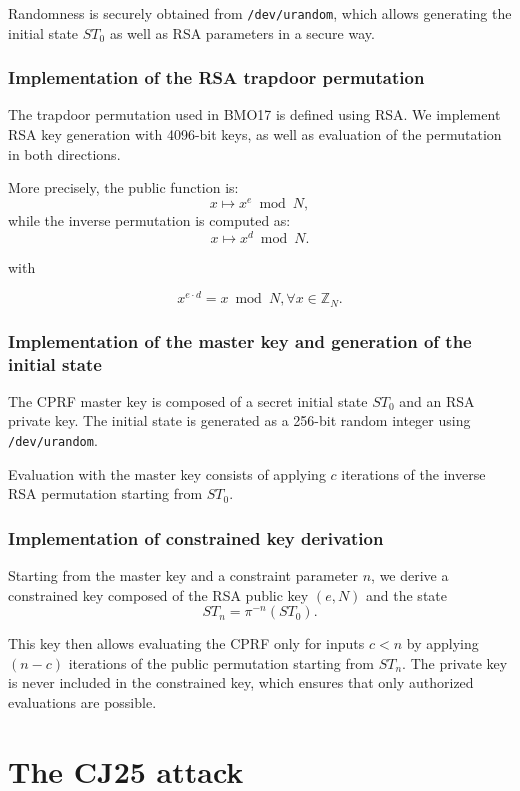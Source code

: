 \documentclass[9pt]{extarticle}
\begin{document}
Randomness is securely obtained from \texttt{/dev/urandom}, which
allows generating the initial state $ST_0$ as well as RSA parameters in a secure way.

\subsubsection{Implementation of the RSA trapdoor permutation}

The trapdoor permutation used in BMO17 is defined using RSA.
We implement RSA key generation with 4096-bit keys, as well as evaluation
of the permutation in both directions.

More precisely, the public function is:
\[
x \mapsto x^e \bmod N,
\]
while the inverse permutation is computed as:
\[
x \mapsto x^d \bmod N.
\]

with

\[
x^{e \cdot d} = x \bmod N , \forall x \in \mathbb{Z}_N.
\]

\subsubsection{Implementation of the master key and generation of the initial state}

The CPRF master key is composed of a secret initial state $ST_0$ and an RSA private key.
The initial state is generated as a 256-bit random integer using
\texttt{/dev/urandom}.

Evaluation with the master key consists of applying $c$ iterations of the inverse RSA permutation
starting from $ST_0$.

\subsubsection{Implementation of constrained key derivation}

Starting from the master key and a constraint parameter $n$, we derive a constrained key
composed of the RSA public key $(e, N)$ and the state
\[
ST_n = \pi^{-n}(ST_0).
\]

This key then allows evaluating the CPRF only for inputs $c < n$ by applying $(n-c)$
iterations of the public permutation starting from $ST_n$. The private key is never included
in the constrained key, which ensures that only authorized evaluations are possible.



\section{The CJ25 attack}
\end{document}
